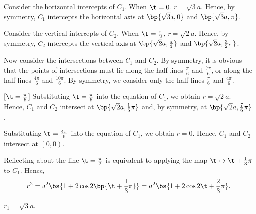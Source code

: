 \begin{solution}
\begin{ppart}
\begin{center}
        \end{center}

        Consider the horizontal intercepts of $C_1$. When $\t = 0$, $r = \sqrt3 a$. Hence, by symmetry, $C_1$ intercepts the horizontal axis at $\bp{\sqrt3a, 0}$ and $\bp{\sqrt3a, \pi}$.

        Consider the vertical intercepts of $C_2$. When $\t = \frac\pi2$, $r = \sqrt2a$. Hence, by symmetry, $C_2$ intercepts the vertical axis at $\bp{\sqrt2a, \frac\pi2}$ and $\bp{\sqrt2a, \frac32 \pi}$.

        Now consider the intersections between $C_1$ and $C_2$. By symmetry, it is obvious that the points of intersections must lie along the half-lines $\frac\pi6$ and $\frac{7\pi}6$, or along the half-lines $\frac{4\pi}6$ and $\frac{10\pi}6$. By symmetry, we consider only the half-lines $\frac\pi6$ and $\frac{4\pi}6$.

        [$\t = \frac\pi6$] Substituting $\t = \frac\pi6$ into the equation of $C_1$, we obtain $r = \sqrt2 a$. Hence, $C_1$ and $C_2$ intersect at $\bp{\sqrt2a, \frac16 \pi}$ and, by symmetry, at $\bp{\sqrt2a, \frac76 \pi}$.

         Substituting $\t = \frac{4\pi}{6}$ into the equation of $C_1$, we obtain $r = 0$. Hence, $C_1$ and $C_2$ intersect at $(0, 0)$.
    \end{ppart}
    \begin{ppart}
        Reflecting about the line $\t = \frac\pi2$ is equivalent to applying the map $\t \mapsto \t + \frac13\pi$ to $C_1$. Hence, \[r^2 = a^2 \bs{1 + 2\cos{2\bp{\t + \frac13\pi}}} = a^2 \bs{1 + 2\cos{2\t + \frac23 \pi }}.\]
    \end{ppart}
    \begin{ppart}
        $r_1 = \sqrt3 a$.
    \end{ppart}
\end{solution}